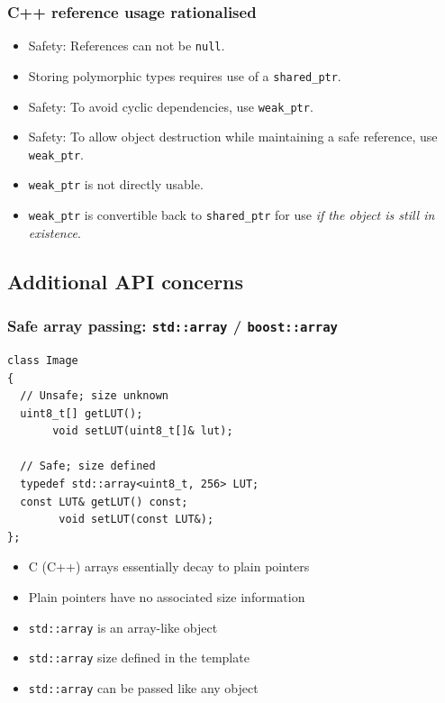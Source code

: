 \documentclass{beamer}
\begin{document}
\begin{frame}[fragile]
  \frametitle{C++ reference usage rationalised}
  \begin{itemize}
  \item Safety: References can not be \texttt{null}.
  \item Storing polymorphic types requires use of a
    \texttt{shared\_ptr}.
  \item Safety: To avoid cyclic dependencies, use \texttt{weak\_ptr}.
  \item Safety: To allow object destruction while maintaining a safe
    reference, use \texttt{weak\_ptr}.
  \item \texttt{weak\_ptr} is not directly usable.
  \item \texttt{weak\_ptr} is convertible back to \texttt{shared\_ptr}
    for use \emph{if the object is still in existence}.
  \end{itemize}
\end{frame}

\subsection{Additional API concerns}

\begin{frame}[fragile]
  \frametitle{Safe array passing: \texttt{std::array} / \texttt{boost::array}}
  \begin{lstlisting}
class Image
{
  // Unsafe; size unknown
  uint8_t[] getLUT();
       void setLUT(uint8_t[]& lut);

  // Safe; size defined
  typedef std::array<uint8_t, 256> LUT;
  const LUT& getLUT() const;
        void setLUT(const LUT&);
};
\end{lstlisting}
  \begin{itemize}
  \item C (C++) arrays essentially decay to plain pointers
  \item Plain pointers have no associated size information
  \item \texttt{std::array} is an array-like object
  \item \texttt{std::array} size defined in the template
  \item \texttt{std::array} can be passed like any object
  \end{itemize}
\end{frame}
\end{document}
